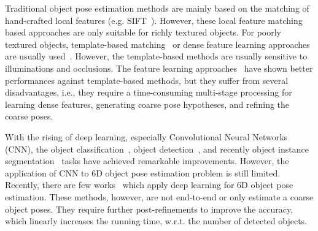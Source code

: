 \documentclass[conference]{IEEEtran}
\newcommand{\junk}[1]{}
\begin{document}
Traditional object pose estimation methods are mainly based on the matching of hand-crafted local features (e.g. SIFT~\cite{SIFT_Lowe}). However, these local feature matching based approaches are only suitable for richly textured objects. For poorly textured objects, template-based matching~\cite{ACCV12,DBLP:conf/eccv/TejaniTKK14,DBLP:conf/iccv/Rios-CabreraT13} or dense feature learning approaches are usually used~\cite{ECCV14,ICCV15,CVPR17,CVPR17_2}. However, the template-based methods are usually sensitive to illuminations and occlusions.  
The feature learning approaches~\cite{ECCV14,ICCV15,CVPR17,CVPR17_2} have shown better performances against template-based methods, but they suffer from several disadvantages, i.e., 
they require a time-consuming multi-stage processing for learning dense features, generating coarse pose hypotheses, and refining the coarse poses. 


With the rising of deep learning, especially Convolutional Neural Networks (CNN), the object classification~\cite{krizhevsky2012imagenet}, object detection~\cite{Fast-RCNN,Faster-RCNN}, and recently object instance segmentation~\cite{Mask-RCNN,affnet} tasks have achieved remarkable  improvements. However, the application of CNN to 6D object pose estimation problem is still limited. 
Recently, there are few works~\cite{SSD-6D,BB8,posecnn} which apply deep learning for 6D object pose estimation. These methods, however, are not end-to-end or only estimate a coarse object poses. They require further post-refinements to improve the accuracy, which linearly increases the running time, w.r.t. the number of detected objects. 

\junk{
The key idea for recent large improvements in object detection and object instance segmentation problems~\cite{Faster-RCNN,Mask-RCNN} is the development of a CNN architecture, i.e., Region Proposal Network (RPN)~\cite{Faster-RCNN}. RPN is actually a CNN which is trained to produce multiple object (bounding boxes) proposals in an image at different shapes and sizes.  
Faster R-CNN~\cite{Faster-RCNN} further refines and classify bounding boxes produced by RPN using additional fully connected layers. %
The recent work Mask R-CNN~\cite{Mask-RCNN} goes beyond Faster-RCNN, i.e., it performs  binary segmentation in each bounding box produced by RPN. %
}
\end{document}
